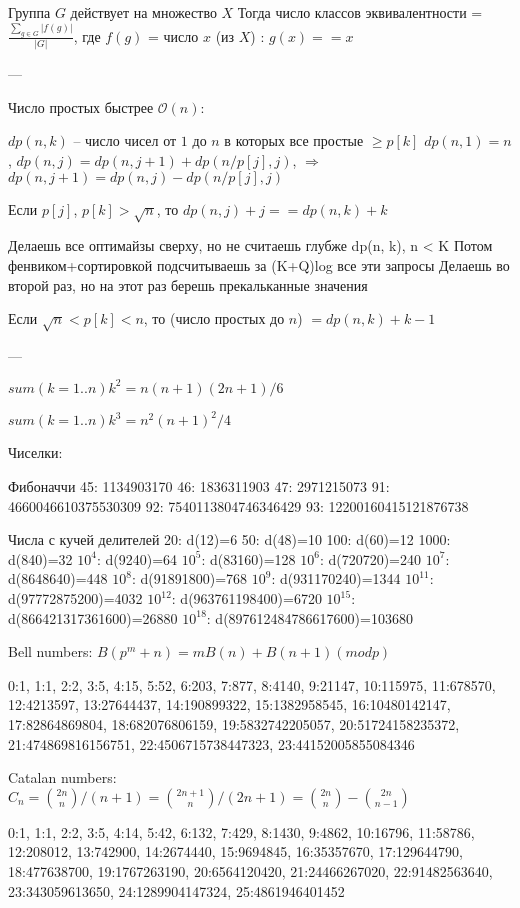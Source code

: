 Группа $G$ действует на множество $X$
Тогда число классов эквивалентности = $\frac{\sum_{g \in G} {|f(g)|}}{|G|}$,
где $f(g)$ = число $x$ (из $X$) : $g(x) == x$

---

Число простых быстрее $\mathcal{O}(n)$: 

$dp(n, k)$ -- число чисел от $1$ до $n$ в которых все простые $\ge p[k]$
$dp(n, 1) = n$, $dp(n, j) = dp(n, j + 1) + dp(n / p[j], j)$, $\Rightarrow$ $dp(n, j + 1) = dp(n, j) - dp(n / p[j], j)$

Если $p[j]$, $p[k] > \sqrt{n}$, то $dp(n, j) + j == dp(n, k) + k$

Делаешь все оптимайзы сверху, но не считаешь глубже dp(n, k), n < K
Потом фенвиком+сортировкой подсчитываешь за (K+Q)log все эти запросы
Делаешь во второй раз, но на этот раз берешь прекальканные значения

Если $\sqrt{n} < p[k] < n$, то (число простых до $n$) $= dp(n, k) + k - 1$

---

$sum(k=1..n) k^2 = n(n+1)(2n+1)/6$

$sum(k=1..n) k^3 = n^2(n+1)^2/4$


Чиселки: 

Фибоначчи
45:  1134903170
46:  1836311903
47:  2971215073
91:  4660046610375530309
92:  7540113804746346429
93:  12200160415121876738

Числа с кучей делителей
20: d(12)=6
50: d(48)=10
100: d(60)=12
1000: d(840)=32
$10^4$: d(9240)=64
$10^5$: d(83160)=128
$10^6$: d(720720)=240
$10^7$: d(8648640)=448
$10^8$: d(91891800)=768
$10^9$: d(931170240)=1344
$10^{11}$: d(97772875200)=4032
$10^{12}$: d(963761198400)=6720
$10^{15}$: d(866421317361600)=26880
$10^{18}$: d(897612484786617600)=103680

Bell numbers:
$B(p^m + n) = mB(n) + B(n + 1) (mod p)$

0:1, 1:1, 2:2, 3:5, 4:15, 5:52, 6:203, 7:877, 8:4140, 9:21147,
10:115975, 11:678570, 12:4213597, 13:27644437, 14:190899322,
15:1382958545, 16:10480142147, 17:82864869804, 18:682076806159,
19:5832742205057, 20:51724158235372, 21:474869816156751,
22:4506715738447323, 23:44152005855084346

Catalan numbers:
$C_n = \binom{2n}{n} / (n + 1) = \binom{2n + 1}{n} / (2n + 1) = \binom{2n}{n} - \binom{2n}{n - 1}$

0:1, 1:1, 2:2, 3:5, 4:14, 5:42, 6:132, 7:429, 8:1430, 9:4862,
10:16796, 11:58786, 12:208012, 13:742900, 14:2674440,
15:9694845, 16:35357670, 17:129644790, 18:477638700,
19:1767263190, 20:6564120420, 21:24466267020, 22:91482563640,
23:343059613650, 24:1289904147324, 25:4861946401452

